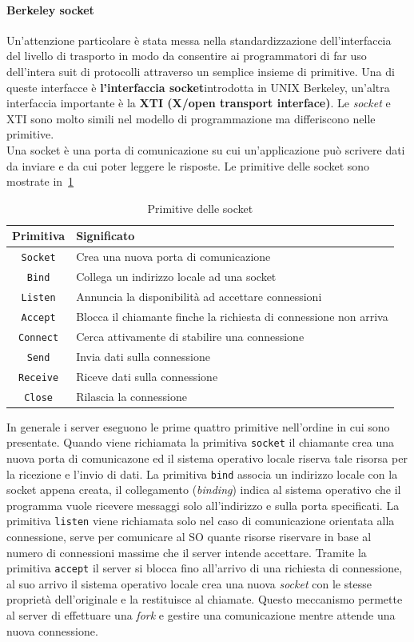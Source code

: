 \paragraph{Berkeley socket}
Un'attenzione particolare è stata messa nella standardizzazione dell'interfaccia del livello di trasporto in modo da consentire ai programmatori di far uso dell'intera suit di protocolli attraverso un semplice insieme di primitive.
Una di queste interfacce è \textbf{l'interfaccia socket}introdotta in UNIX Berkeley, un'altra interfaccia importante è la \textbf{XTI (X/open transport interface)}. Le \emph{socket} e XTI sono molto simili nel modello di programmazione ma differiscono nelle primitive.\\
Una socket è una porta di comunicazione su cui un'applicazione può scrivere dati da inviare e da cui poter leggere le risposte.
Le primitive delle socket sono mostrate in \tablename\,\ref{tab:socket}
\begin{table}
\centering
\begin{tabular}{|c|l|}
\hline
\textbf{Primitiva} & \textbf{Significato} \\
\hline
\texttt{Socket} & Crea una nuova porta di comunicazione \\
\texttt{Bind} & Collega un indirizzo locale ad una socket\\
\texttt{Listen} & Annuncia la disponibilità ad accettare connessioni\\
\texttt{Accept} & Blocca il chiamante finche la richiesta di connessione non arriva\\
\texttt{Connect} & Cerca attivamente di stabilire una connessione\\
\texttt{Send} & Invia dati sulla connessione\\
\texttt{Receive} & Riceve dati sulla connessione\\
\texttt{Close} & Rilascia la connessione\\
\hline
\end{tabular}
\caption{Primitive delle socket}\label{tab:socket}
\end{table}
In generale i server eseguono le prime quattro primitive nell'ordine in cui sono presentate. Quando viene richiamata la primitiva \texttt{socket} il chiamante crea una nuova porta di comunicazone ed il sistema operativo locale riserva tale risorsa per la ricezione e l'invio di dati. La primitiva \texttt{bind} associa un indirizzo locale con la socket appena creata, il collegamento (\emph{binding}) indica al sistema operativo che il programma vuole ricevere messaggi solo all'indirizzo e sulla porta specificati. La primitiva \texttt{listen} viene richiamata solo nel caso di comunicazione orientata alla connessione, serve per comunicare al SO quante risorse riservare in base al numero di connessioni massime che il server intende accettare. Tramite la primitiva \texttt{accept} il server si blocca fino all'arrivo di una richiesta di connessione, al suo arrivo il sistema operativo locale crea una nuova \emph{socket} con le stesse proprietà dell'originale e la restituisce al chiamate. Questo meccanismo permette al server di effettuare una \emph{fork} e gestire una comunicazione mentre attende una nuova connessione.\\
